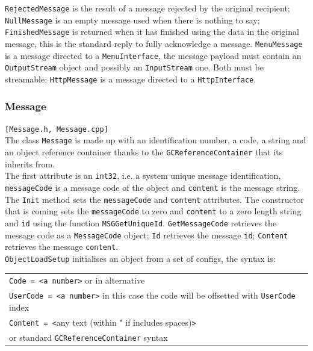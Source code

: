 \texttt{RejectedMessage} is the result of a message rejected by the original recipient; \texttt{NullMessage} is an empty message used when there is nothing to say; \texttt{FinishedMessage} is returned when it has finished using the data in the original message, this is the standard reply to fully acknowledge a message. \texttt{MenuMessage} is a message directed to a \texttt{MenuInterface}, the message payload must contain an \texttt{OutputStream} object and possibly an \texttt{InputStream} one. Both must be streamable; \texttt{HttpMessage} is a message directed to a \texttt{HttpInterface}.



\subsubsection{Message}
\texttt{[Message.h, Message.cpp]}\\
The class \texttt{Message} is made up with an identification number, a code, a string and an object reference container thanks to the \texttt{GCReferenceContainer} that its inherits from. \\


The first attribute is an \texttt{int32}, i.e. a system unique message identification, \texttt{messageCode} is a message code of the object and \texttt{content} is the message string. \\

The \texttt{Init} method sets the \texttt{messageCode} and \texttt{content} attributes. The constructor that is coming sets the \texttt{messageCode} to zero and \texttt{content} to a zero length string and \texttt{id} using the function \texttt{MSGGetUniqueId}. \texttt{GetMessageCode} retrieves the message code as a \texttt{MessageCode} object; \texttt{Id} retrieves the message \texttt{id}; \texttt{Content} retrieves the message \texttt{content}. \\

\noindent \texttt{ObjectLoadSetup} initialises an object from a set of configs, the syntax is:
\begin{table}[!h]
  \begin{tabular}{l}
\texttt{Code = <a number>} or in alternative \\
\texttt{UserCode = <a number>} in this case the code will be offsetted with \texttt{UserCode} index \\
\texttt{Content = <}any text (within " if includes spaces)\texttt{>} \\
or standard \texttt{GCReferenceContainer} syntax \\
  \end{tabular}
\end{table}

